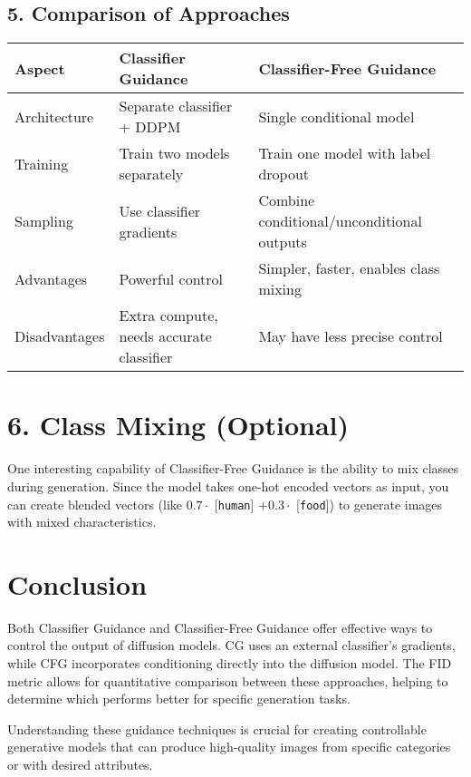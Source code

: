 \subsection*{5. Comparison of Approaches}

\begin{table}[h!]
\centering
\begin{tabular}{|l|l|l|}
\hline
\textbf{Aspect} & \textbf{Classifier Guidance} & \textbf{Classifier-Free Guidance} \\
\hline
Architecture & Separate classifier + DDPM & Single conditional model \\
\hline
Training & Train two models separately & Train one model with label dropout \\
\hline
Sampling & Use classifier gradients & Combine conditional/unconditional outputs \\
\hline
Advantages & Powerful control & Simpler, faster, enables class mixing \\
\hline
Disadvantages & Extra compute, needs accurate classifier & May have less precise control \\
\hline
\end{tabular}
\end{table}
\section*{6. Class Mixing (Optional)}
One interesting capability of Classifier-Free Guidance is the ability to mix classes during generation. Since the model takes one-hot encoded vectors as input, you can create blended vectors (like $0.7 \cdot$ [\texttt{human}] $+ 0.3 \cdot$ [\texttt{food}]) to generate images with mixed characteristics.

\section*{Conclusion}
Both Classifier Guidance and Classifier-Free Guidance offer effective ways to control the output of diffusion models. CG uses an external classifier’s gradients, while CFG incorporates conditioning directly into the diffusion model. The FID metric allows for quantitative comparison between these approaches, helping to determine which performs better for specific generation tasks.

Understanding these guidance techniques is crucial for creating controllable generative models that can produce high-quality images from specific categories or with desired attributes.
